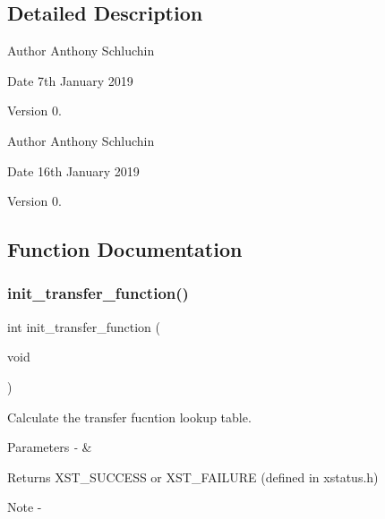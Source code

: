 \subsection{Detailed Description}
\begin{DoxyAuthor}{Author}
Anthony Schluchin 
\end{DoxyAuthor}
\begin{DoxyDate}{Date}
7th January 2019 
\end{DoxyDate}
\begin{DoxyVersion}{Version}
0.
\end{DoxyVersion}
\begin{DoxyAuthor}{Author}
Anthony Schluchin 
\end{DoxyAuthor}
\begin{DoxyDate}{Date}
16th January 2019 
\end{DoxyDate}
\begin{DoxyVersion}{Version}
0. 
\end{DoxyVersion}


\subsection{Function Documentation}
\mbox{\label{transfer__function_8c_ab0763112842c0400c0bc611fb9b8bca8}} 
\subsubsection{init\_transfer\_function()}
{\footnotesize\ttfamily int init\+\_\+transfer\+\_\+function (\begin{DoxyParamCaption}\item[{void}]{ }\end{DoxyParamCaption})}



Calculate the transfer fucntion lookup table. 


\begin{DoxyParams}{Parameters}
{\em -\/} & \\
\hline
\end{DoxyParams}
\begin{DoxyReturn}{Returns}
X\+S\+T\+\_\+\+S\+U\+C\+C\+E\+SS or X\+S\+T\+\_\+\+F\+A\+I\+L\+U\+RE (defined in xstatus.\+h)
\end{DoxyReturn}
\begin{DoxyNote}{Note}
-\/ 
\end{DoxyNote}
